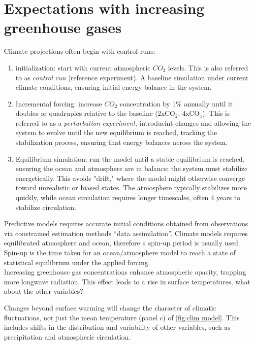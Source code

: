 \section{Expectations with increasing greenhouse gases}
Climate projections often begin with control runs: 
\begin{enumerate}
    \item initialization: start with current atmospheric $CO_2$ levels. This is also referred to as \textit{control run} (reference experiment). A baseline simulation under current climate conditions, ensuring initial energy balance in the system.
    \item Incremental forcing: increase $CO_2$ concentration by 1\% annually until it doubles or quadruples relative to the baseline (2xCO$_2$, 4xCO$_4$). This is referred to as a \textit{perturbation experiment}, introducint changes and allowing the system to evolve until the new equilibrium is reached, tracking the stabilization process, ensuring that energy balances across the system.
    \item Equilibrium simulation: run the model until a stable equilibrium is reached, ensuring the ocean and atmosphere are in balance: the system must stabilize energetically. This avoids "drift," where the model might otherwise converge toward unrealistic or biased states. The atmosphere typically stabilizes more quickly, while ocean circulation requires longer timescales, often 4 years to stabilize circulation. 
\end{enumerate}
Predictive models requires accurate initial conditions obtained
from observations via constrained estimation methods “data
assimilation”. Climate models requires equilibrated atmosphere and ocean, therefore a spin-up period is usually used. Spin-up is the time taken for an ocean/atmosphere model to reach a state of statistical equilibrium under the applied forcing.\\


Increasing greenhouse gas concentrations enhance atmospheric opacity, trapping more longwave radiation. This effect leads to a rise in surface temperatures, what about the other variables?

Changes beyond surface warming will change the character of climatic fluctuations, not just the mean temperature (panel c) of \ref{fig:clim model}. This includes shifts in the distribution and variability of other variables, such as precipitation and atmospheric circulation.



